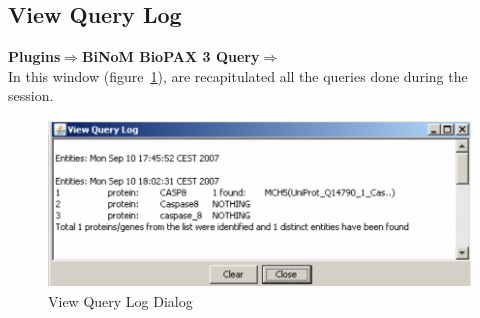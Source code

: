 \subsection{View Query Log}
\textbf{Plugins$\Rightarrow$BiNoM BioPAX 3 Query$\Rightarrow$}\\
In this window (figure~\ref{BioPAXViewQueryLogDialog}), are recapitulated all the queries done during the session.
\begin{figure}[h]
\centering
\includegraphics[width=18 cm]{graphics/BioPAXViewQueryLogDialog}
\caption{View Query Log Dialog}
\label{BioPAXViewQueryLogDialog}
\end{figure}